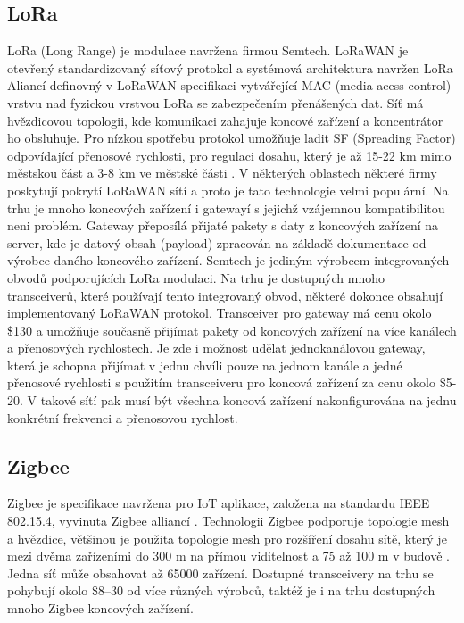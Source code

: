 \subsection{LoRa}
LoRa (Long Range) je modulace navržena firmou Semtech.
LoRaWAN je otevřený standardizovaný síťový protokol a systémová architektura navržen LoRa Aliancí definovný v LoRaWAN specifikaci \cite{lorawan_specification} vytvářející MAC (media acess control) vrstvu nad fyzickou vrstvou LoRa se zabezpečením přenášených dat. 
Síť má hvězdicovou topologii, kde komunikaci zahajuje koncové zařízení a koncentrátor ho obsluhuje.
Pro nízkou spotřebu protokol umožňuje ladit SF (Spreading Factor) odpovídající přenosové rychlosti, pro regulaci dosahu, který je až 15-22 km mimo městskou část a 3-8 km ve městské části \cite{lorawan_specification}.
V některých oblastech některé firmy poskytují pokrytí LoRaWAN sítí a proto je tato technologie velmi populární. Na trhu je mnoho koncových zařízení i gatewayí s jejichž vzájemnou kompatibilitou neni problém. Gateway přeposílá přijaté pakety s daty z koncových zařízení na server, kde je datový obsah (payload) zpracován na základě dokumentace od výrobce daného koncového zařízení.
Semtech je jediným výrobcem integrovaných obvodů podporujících LoRa modulaci. Na trhu je dostupných mnoho transceiverů, které používají tento integrovaný obvod, některé dokonce obsahují implementovaný LoRaWAN protokol.
Transceiver pro gateway má cenu okolo \$130 a umožňuje současně přijímat pakety od koncových zařízení na více kanálech a přenosových rychlostech. Je zde i možnost udělat jednokanálovou gateway, která je schopna přijímat v jednu chvíli pouze na jednom kanále a jedné přenosové rychlosti s použitím transceiveru pro koncová zařízení za cenu okolo \$5-20. V takové sítí pak musí být všechna koncová zařízení nakonfigurována na jednu konkrétní frekvenci a přenosovou rychlost.



\subsection{Zigbee}
Zigbee je specifikace navržena pro IoT aplikace, založena na standardu  IEEE 802.15.4, vyvinuta Zigbee alliancí \cite{Zigbee_alliance_about}.
Technologii Zigbee podporuje topologie mesh a hvězdice, většinou je použita topologie mesh pro rozšíření dosahu sítě, který je mezi dvěma zařízeními do 300 m na přímou viditelnost a 75 až 100 m v budově \cite{Zigbee_alliance_solution}. Jedna síť může obsahovat až 65000 zařízení.
Dostupné transceivery na trhu se pohybují okolo \$8–30 od více různých výrobců, taktéž je i na trhu dostupných mnoho Zigbee koncových zařízení.


